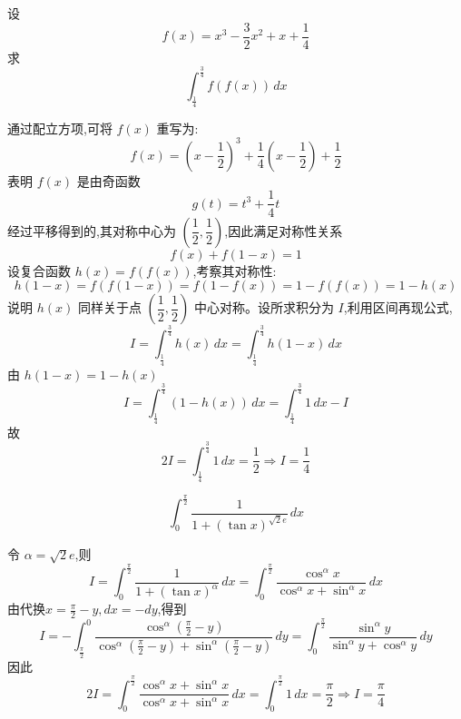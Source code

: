 \begin{questions}
    \question 设
    \[
    f(x) = x^3 - \frac{3}{2}x^2 + x + \frac{1}{4}
    \]
    求 
    \[
    \int_{\frac{1}{4}}^{\frac{3}{4}} f(f(x)) \, dx
    \]
    \begin{solution}
        通过配立方项,可将 $f(x)$ 重写为:
        \[
        f(x) = \left(x - \frac{1}{2}\right)^3 + \frac{1}{4}\left(x - \frac{1}{2}\right) + \frac{1}{2}
        \]
        表明 $f(x)$ 是由奇函数 
        \[
        g(t) = t^3 + \frac{1}{4}t
        \]
        经过平移得到的,其对称中心为 $\left(\dfrac{1}{2}, \dfrac{1}{2}\right)$,因此满足对称性关系
        \[
        f(x) + f(1-x) = 1
        \]
        设复合函数 $h(x) = f(f(x))$,考察其对称性:
        \[
        h(1-x) = f(f(1-x)) = f(1-f(x))= 1 - f(f(x)) = 1 - h(x)
        \]
        说明 $h(x)$ 同样关于点 $\left(\dfrac{1}{2}, \dfrac{1}{2}\right)$ 中心对称。设所求积分为 $I$,利用区间再现公式,
        \[
        I = \int_{\frac{1}{4}}^{\frac{3}{4}} h(x) \, dx = \int_{\frac{1}{4}}^{\frac{3}{4}} h(1-x) \, dx
        \]
        由 $h(1-x) = 1 - h(x)$
        \[
        I = \int_{\frac{1}{4}}^{\frac{3}{4}} (1 - h(x)) \, dx = \int_{\frac{1}{4}}^{\frac{3}{4}} 1 \, dx - I
        \]
        故
        \[
        2I = \int_{\frac{1}{4}}^{\frac{3}{4}} 1 \, dx = \frac{1}{2} \Rightarrow I = \frac{1}{4}
        \]
    \end{solution}

    \question
    \[
    \int_{0}^{\frac{\pi}{2}} \frac{1}{1+(\tan x)^{\sqrt{2} e}} \, dx
    \]
    \begin{solution}
        令 $\alpha = \sqrt{2} e$,则
        \[
        I=\int_{0}^{\frac{\pi}{2}} \frac{1}{1+(\tan x)^\alpha} \, dx= \int_{0}^{\frac{\pi}{2}} \frac{\cos^\alpha x}{\cos^\alpha x + \sin^\alpha x} \, dx
        \]
        由代换$x = \frac{\pi}{2}-y, dx = -dy$,得到
        \[
        I = - \int_{\frac{\pi}{2}}^{0} \frac{\cos^\alpha (\frac{\pi}{2}-y)}{\cos^\alpha (\frac{\pi}{2}-y) + \sin^\alpha (\frac{\pi}{2}-y)} \, dy
        = \int_{0}^{\frac{\pi}{2}} \frac{\sin^\alpha y}{\sin^\alpha y + \cos^\alpha y} \, dy
        \]
        因此
        \[
        2I = \int_{0}^{\frac{\pi}{2}} \frac{\cos^\alpha x + \sin^\alpha x}{\cos^\alpha x + \sin^\alpha x} \, dx
        = \int_{0}^{\frac{\pi}{2}} 1 \, dx
        = \frac{\pi}{2} \Rightarrow I = \frac{\pi}{4}
        \]
    \end{solution}


\end{questions}
